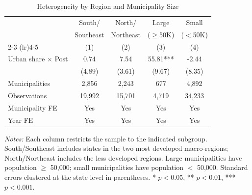 \begin{table}[htbp]
\centering
\caption{Heterogeneity by Region and Municipality Size}
\label{tab:hetero}
\begin{tabular}{lcccc}
\toprule
 & South/ & North/ & Large & Small \\
 & Southeast & Northeast & ($\geq$50K) & ($<$50K) \\
\cmidrule(lr){2-3} \cmidrule(lr){4-5}
 & (1) & (2) & (3) & (4) \\
\midrule
Urban share $\times$ Post & 0.74 & 7.54 & 55.81*** & -2.44 \\
 & (4.89) & (3.61) & (9.67) & (8.35) \\
\midrule
Municipalities & 2,856 & 2,243 & 677 & 4,892 \\
Observations & 19,992 & 15,701 & 4,719 & 34,233 \\
Municipality FE & Yes & Yes & Yes & Yes \\
Year FE & Yes & Yes & Yes & Yes \\
\bottomrule
\end{tabular}
\begin{tablenotes}
\item \textit{Notes:} Each column restricts the sample to the indicated subgroup. South/Southeast includes states in the two most developed macro-regions; North/Northeast includes the less developed regions. Large municipalities have population $\geq$ 50,000; small municipalities have population $<$ 50,000. Standard errors clustered at the state level in parentheses. * $p < 0.05$, ** $p < 0.01$, *** $p < 0.001$.
\end{tablenotes}
\end{table}
